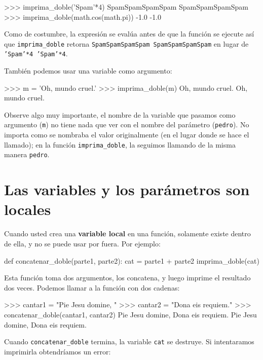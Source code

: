 \beforeverb
\begin{pyconcode}
>>> imprima_doble('Spam'*4)
SpamSpamSpamSpam SpamSpamSpamSpam
>>> imprima_doble(math.cos(math.pi))
-1.0 -1.0
\end{pyconcode}
\afterverb
%

Como de costumbre, la expresión se evalúa antes de que la función se ejecute
así que \texttt{imprima\_doble} retorna \texttt{SpamSpamSpamSpam 
SpamSpamSpamSpam} en lugar de \texttt{'Spam'*4 'Spam'*4}.

También podemos usar una variable como argumento:

\beforeverb
\begin{pyconcode}
>>> m = 'Oh, mundo cruel.'
>>> imprima_doble(m)
Oh, mundo cruel. Oh, mundo cruel.
\end{pyconcode}
\afterverb
%

Observe algo muy importante, el nombre de la variable que pasamos como
argumento  (\texttt{m}) no tiene nada que ver con el nombre del parámetro 
(\texttt{pedro}).  No importa como se nombraba el valor originalmente (en el 
lugar donde se hace el llamado); en la función  \texttt{imprima\_doble}, la 
seguimos llamando de la misma manera \texttt{pedro}.

\section{Las variables y los parámetros son locales}

Cuando usted crea una {\bf variable local} en una función, solamente 
existe dentro de ella, y no se puede usar por fuera. Por ejemplo:

\beforeverb
\begin{pythoncode}
def concatenar_doble(parte1, parte2):
  cat = parte1 + parte2
  imprima_doble(cat)
\end{pythoncode}
\afterverb
%

Esta función toma dos argumentos, los concatena, y luego imprime el resultado
dos veces.
Podemos llamar a la función con dos cadenas:

\beforeverb
\begin{pyconcode}
>>> cantar1 = "Pie Jesu domine, "
>>> cantar2 = "Dona eis requiem."
>>> concatenar_doble(cantar1, cantar2)
Pie Jesu domine, Dona eis requiem. Pie Jesu domine, Dona 
eis requiem.
\end{pyconcode}
\afterverb
%

Cuando \texttt{concatenar\_doble} termina, la variable \texttt{cat} se destruye.
Si intentaramos imprimirla obtendríamos un error:

